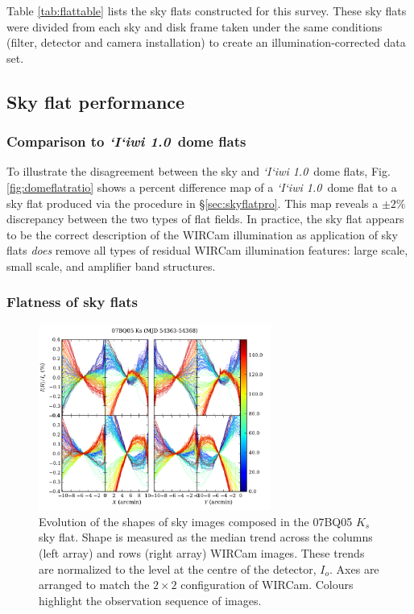 \documentclass[iop]{emulateapj}
\newcommand{\sw}[1]{\textit{#1}} %
\newcommand{\iiwione}{\sw{`I`iwi 1.0}}
\begin{document}
Table \ref{tab:flattable} lists the sky flats constructed for this survey. These sky flats were divided from each sky and disk frame taken under the same conditions (filter, detector and camera installation) to create an illumination-corrected data set.


\subsection{Sky flat performance}
\label{sec:skyflatstats}


\subsubsection{Comparison to \iiwione\ dome flats}

To illustrate the disagreement between the sky and \iiwione\ dome flats, Fig. \ref{fig:domeflatratio} shows a percent difference map of a \iiwione\ dome flat to a sky flat produced via the procedure in \S \ref{sec:skyflatpro}. This map reveals a $\pm2\%$ discrepancy between the two types of flat fields.
In practice, the sky flat appears to be the correct description of the WIRCam illumination as application of sky flats \emph{does} remove all types of residual WIRCam illumination features: large scale, small scale, and amplifier band structures.

\subsubsection{Flatness of sky flats}
\label{sec:skyflatshapes}

\begin{figure}[t]
    \centering
        \includegraphics[width=3in]{figs/07BQ05_Ks.pdf}
    \caption{Evolution of the shapes of sky images composed in the 07BQ05 $K_s$ sky flat. Shape is measured as the median trend across the columns (left array) and rows (right array) WIRCam images. These trends are normalized to the level at the centre of the detector, $I_o$. Axes are arranged to match the $2 \times 2$ configuration of WIRCam. Colours highlight the observation sequence of images.}
    \label{fig:flat_07BQ05_Ks}
\end{figure}
\end{document}
